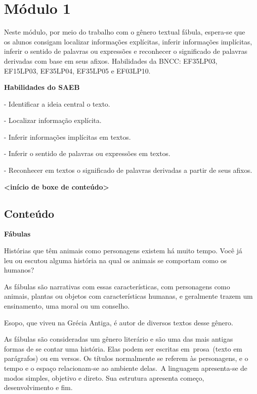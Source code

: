 \section{Módulo 1}\label{muxf3dulo-1}

\protect\hypertarget{_Hlk127342659}{}{}Neste módulo, por meio do
trabalho com o gênero textual fábula, espera-se que os alunos consigam
localizar informações explícitas, inferir informações implícitas,
inferir o sentido de palavras ou expressões e reconhecer o significado
de palavras derivadas com base em seus afixos.
\protect\hypertarget{_Hlk127342929}{}{}Habilidades da BNCC: EF35LP03,
EF15LP03, EF35LP04, EF35LP05 e EF03LP10.

\textbf{Habilidades do SAEB}

- Identificar a ideia central o texto.

- Localizar informação explícita.

- Inferir informações implícitas em textos.

- Inferir o sentido de palavras ou expressões em textos.

- Reconhecer em textos o significado de palavras derivadas a partir de
seus afixos.

\textbf{\textless{}início de boxe de conteúdo\textgreater{}}

\subsection{Conteúdo}\label{conteuxfado}

\textbf{Fábulas}

Histórias que têm animais como personagens existem há muito tempo. Você
já leu ou escutou alguma história na qual os animais se comportam como
os humanos?

As fábulas são narrativas com essas características, com personagens
como animais, plantas ou objetos com características humanas, e
geralmente trazem um ensinamento, uma moral ou um conselho.

Esopo, que viveu na Grécia Antiga, é autor de diversos textos desse
gênero.

As fábulas são consideradas um gênero literário e são uma das mais
antigas formas de se contar uma história. Elas podem ser escritas
em~prosa~(texto em parágrafos) ou em versos. Os títulos normalmente se
referem às personagens, e o tempo e o espaço relacionam-se ao ambiente
delas.~A linguagem apresenta-se de modos simples, objetivo e direto. Sua
estrutura apresenta começo, desenvolvimento e fim.

